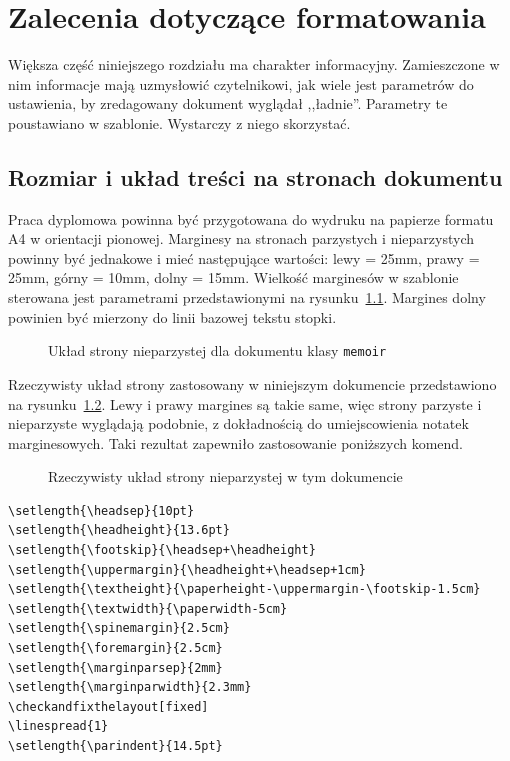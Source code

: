 \chapter{Zalecenia dotyczące formatowania}
Większa część niniejszego rozdziału ma charakter informacyjny. Zamieszczone w nim informacje mają uzmysłowić czytelnikowi, jak wiele jest parametrów do ustawienia, by zredagowany dokument wyglądał ,,ładnie''. Parametry te poustawiano w szablonie. Wystarczy z niego skorzystać.

\section{Rozmiar i układ treści na stronach dokumentu}
Praca dyplomowa powinna być przygotowana do wydruku na papierze formatu A4 w orientacji pionowej.
Marginesy na stronach parzystych i nieparzystych powinny być jednakowe i mieć następujące wartości:
lewy = 25mm, prawy = 25mm, górny = 10mm, dolny = 15mm. Wielkość marginesów w szablonie sterowana jest parametrami przedstawionymi na rysunku~\ref{fig:pageLayout}. Margines dolny powinien być mierzony do linii bazowej tekstu stopki.
\begin{figure}[htb]
	\currentpage
	\drawparameterstrue
	\oddpagelayoutfalse
	\drawstock
	\caption{Układ strony nieparzystej dla dokumentu klasy \texttt{memoir}} \label{fig:pageLayout}
\end{figure}

Rzeczywisty układ strony zastosowany w niniejszym dokumencie przedstawiono na rysunku~\ref{fig:currentPageLayout}. Lewy i prawy margines są takie same, więc strony parzyste i nieparzyste wyglądają podobnie, z dokładnością do umiejscowienia notatek marginesowych. Taki rezultat zapewniło zastosowanie poniższych komend.
\begin{figure}[t]
	\currentstock
	\oddpagelayouttrue
	\twocolumnlayoutfalse
	\drawmarginparstrue
	\drawparametersfalse
	\drawstock
	\caption{Rzeczywisty układ strony nieparzystej w tym dokumencie} \label{fig:currentPageLayout}
\end{figure}

\begin{lstlisting}[basicstyle=\footnotesize\ttfamily]
\setlength{\headsep}{10pt}
\setlength{\headheight}{13.6pt}
\setlength{\footskip}{\headsep+\headheight}
\setlength{\uppermargin}{\headheight+\headsep+1cm}
\setlength{\textheight}{\paperheight-\uppermargin-\footskip-1.5cm}
\setlength{\textwidth}{\paperwidth-5cm}
\setlength{\spinemargin}{2.5cm}
\setlength{\foremargin}{2.5cm}
\setlength{\marginparsep}{2mm}
\setlength{\marginparwidth}{2.3mm}
\checkandfixthelayout[fixed]
\linespread{1}
\setlength{\parindent}{14.5pt}
\end{lstlisting}


